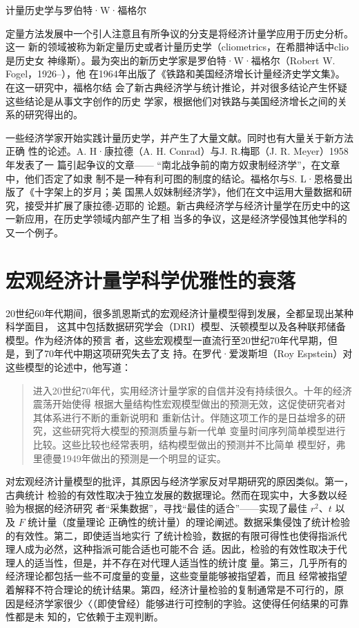 \begin{mybox}{计量历史学与罗伯特·W·福格尔}
  \begin{multicols}{2}
    定量方法发展中一个引人注意且有所争议的分支是将经济计量学应用于历史分析。这一
    新的领域被称为新定量历史或者计量历史学（cliometrics，在希腊神话中clio是历史女
    神缘斯）。最为突出的新历史学家是罗伯特·W·福格尔（Robert W. Fogel，1926--），他
    在1964年出版了《铁路和美国经济增长计量经济史学文集》。在这一研究中，福格尔结
    会了新古典经济学与统计推论，并对很多结论产生怀疑这些结论是从事文字创作的历史
    学家，根据他们对铁路与美国经济增长之间的关系的研究得出的。

    一些经济学家开始实践计量历史学，并产生了大量文献。同时也有大量关于新方法正确
    性的论述。A. H·康拉德（A. H. Conrad）与J. R.梅耶（J. R. Meyer）1958年发表了一
    篇引起争议的文章—— “南北战争前的南方奴隶制经济学”，在文章中，他们否定了如隶
    制不是一种有利可图的制度的结论。福格尔与S. L·恩格曼出版了《十字架上的岁月；美
    国黑人奴妹制经济学》，他们在文中运用大量数据和研究，接受并扩展了康拉德-迈耶的
    论题。新古典经济学与经济计量学在历史中的这一新应用，在历史学领域内部产生了相
    当多的争议，这是经济学侵蚀其他学科的又一个例子。
  \end{multicols}
\end{mybox}

\section{宏观经济计量学科学优雅性的衰落}

20世纪60年代期间，很多凯恩斯式的宏观经济计量模型得到发展，全都呈现出某种科学面目，
这其中包括数据研究学会（DRI）模型、沃顿模型以及各种联邦储备模型。作为经济体的预言
者，这些宏观模型一直流行至20世纪70年代早期，但是，到了70年代中期这项研究失去了支
持。在罗代·爱泼斯坦（Roy Espstein）对这些模型的论述中，他写道：

\begin{quotation}
  进入20世纪70年代，实用经济计量学家的自信并没有持续很久。十年的经济震荡开始使得
  根据大量结构性宏观模型做出的预测无效，这促使研究者对其体系进行不断的重新说明和
  重新估计。伴随这项工作的是日益增多的研究，这些研究将大模型的预测质量与新一代单
  变量时间序列简单模型进行比较。这些比较也经常表明，结构模型做出的预测并不比简单
  模型好，弗里德曼1949年做出的预测是一个明显的证实。
\end{quotation}

对宏观经济计量模型的批评，其原因与经济学家反对早期研究的原因类似。第一，古典统计
检验的有效性取决于独立发展的数据理论。然而在现实中，大多数以经验为根据的经济研究
者“采集数据”，寻找“最佳的适合”——实现了最佳 $r^2、t$ 以及 $F$ 统计量（度量理论
正确性的统计量）的理论阐述。数据采集侵蚀了统计检验的有效性。第二，即使适当地实行
了统计检验，数据的有限可得性也使得指派代理人成为必然，这种指派可能合适也可能不合
适。因此，检验的有效性取决于代理人的适当性，但是，并不存在对代理人适当性的统计度
量。第三，几乎所有的经济理论都包括一些不可度量的变量，这些变量能够被指望着，而且
经常被指望着解释不符合理论的统计结果。第四，经济计量检验的复制通常是不可行的，原
因是经济学家很少〈（即使曾经）能够进行可控制的字验。这使得任何结果的可靠性都是未
知的，它依赖于主观判断。

